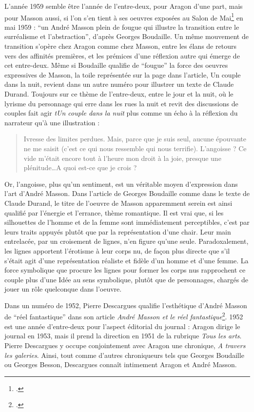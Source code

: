 L’année 1959 semble être l’année de l’entre-deux, pour Aragon d’une part, mais pour Masson aussi, si l’on s’en tient à ses oeuvres exposées au Salon de Mai\footcite{salondemai} en mai 1959 : \enquote{un André Masson plein de fougue qui illustre la transition entre le surréalisme et l’abstraction}, d’après Georges Boudaille. Un même mouvement de transition s’opère chez Aragon comme chez Masson, entre les élans de retours vers des affinités premières, et les prémices d’une réflexion autre qui émerge de cet entre-deux. Même si Boudaille qualifie de \enquote{fougue} la force des oeuvres expressives de Masson, la toile représentée sur la page dans l’article, Un couple dans la nuit, revient dans un autre numéro pour illustrer un texte de Claude Durand. Toujours sur ce thème de l’entre-deux, entre le jour et la nuit, où le lyrisme du personnage qui erre dans les rues la nuit et revit des discussions de couples fait agir \emph{tUn couple dans la nuit} plus comme un écho à la réflexion du narrateur qu’à une illustration : 


\begin{quote}
Ivresse des limites perdues. Mais, parce que je suis seul, aucune épouvante ne me saisit (c’est ce qui nous ressemble qui nous terrifie). L’angoisse ? Ce vide m’était encore tout à l’heure mon droit à la joie, presque une plénitude…A quoi est-ce que je crois ? 	
\end{quote}


 Or, l’angoisse, plus qu’un sentiment, est un véritable moyen d’expression dans l’art d’André Masson. Dans l’article de Georges Boudaille comme dans le texte de Claude Durand, le titre de l’oeuvre de Masson apparemment serein est ainsi qualifié par l’énergie et l’errance, thème romantique. Il est vrai que, si les silhouettes de l’homme et de la femme sont immédiatement perceptibles, c’est par leurs traits appuyés plutôt que par la représentation d’une chair. Leur main entrelacée, par un croisement de lignes, n’en figure qu’une seule. Paradoxalement, les lignes apportent l’érotisme à leur corps nu, de façon plus directe que s’il s’était agit d’une représentation réaliste et fidèle d’un homme et d’une femme. La force symbolique que procure les lignes pour former les corps nus rapprochent ce couple plus d’une Idée au sens symbolique, plutôt que de personnages, chargés de jouer un rôle quelconque dans l’oeuvre.  


Dans un numéro de 1952, Pierre Descargues qualifie l’esthétique d’André Masson de \enquote{réel fantastique} dans son article \emph{André Masson et le réel fantastique}\footcite{reelfantastique}. 1952 est une année d’entre-deux pour l’aspect éditorial du journal : Aragon dirige le journal en 1953, mais il prend la direction en 1951 de la rubrique \emph{Tous les arts}. Pierre Descargues y occupe conjointement avec Aragon une chronique, \emph{A travers les galeries}. Ainsi, tout comme d’autres chroniqueurs tels que Georges Boudaille ou Georges Besson, Descargues connaît intimement Aragon et André Masson. 

